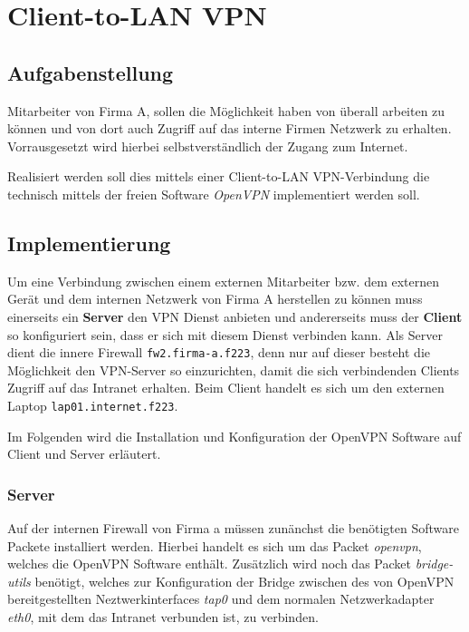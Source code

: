 \chapter{Client-to-LAN VPN}

\section{Aufgabenstellung}

Mitarbeiter von Firma A, sollen die Möglichkeit haben von überall arbeiten zu können und von dort auch Zugriff auf das interne Firmen Netzwerk zu erhalten.
Vorrausgesetzt wird hierbei selbstverständlich der Zugang zum Internet.

Realisiert werden soll dies mittels einer Client-to-LAN VPN-Verbindung die technisch mittels der freien Software \emph{OpenVPN} implementiert werden soll.

\section{Implementierung}

Um eine Verbindung zwischen einem externen Mitarbeiter bzw. dem externen Gerät und dem internen Netzwerk von Firma A herstellen zu können muss einerseits ein \textbf{Server} den VPN Dienst anbieten und andererseits muss der \textbf{Client} so konfiguriert sein, dass er sich mit diesem Dienst verbinden kann.
Als Server dient die innere Firewall \texttt{fw2.firma-a.f223}, denn nur auf dieser besteht die Möglichkeit den VPN-Server so einzurichten, damit die sich verbindenden Clients Zugriff auf das Intranet erhalten.
Beim Client handelt es sich um den externen Laptop \texttt{lap01.internet.f223}.

Im Folgenden wird die Installation und Konfiguration der OpenVPN Software auf Client und Server erläutert.


\subsection{Server}\label{vpn:server}

Auf der internen Firewall von Firma a müssen zunänchst die benötigten Software Packete installiert werden. Hierbei handelt es sich um das Packet \emph{openvpn}, welches die OpenVPN Software enthält. Zusätzlich wird noch das Packet \emph{bridge-utils} benötigt, welches zur Konfiguration der Bridge zwischen des von OpenVPN bereitgestellten Neztwerkinterfaces \emph{tap0} und dem normalen Netzwerkadapter \emph{eth0}, mit dem das Intranet verbunden ist, zu verbinden.

